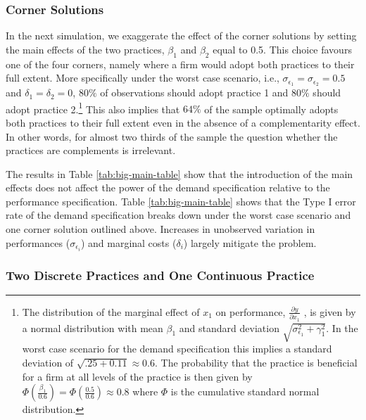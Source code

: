 \documentclass[12pt]{article}
\begin{document}
\subsubsection{Corner Solutions}

In the next simulation, we exaggerate the effect of the corner solutions by setting the main effects of the two practices, $\beta_{1}$ and $\beta_2$ equal to 0.5. This choice favours one of the four corners, namely where a firm would adopt both practices to their full extent. More specifically under the worst case scenario, i.e., $\sigma_{\epsilon_1} = \sigma_{\epsilon_2} = 0.5$ and $\delta_1 = \delta_2 = 0$, $80\%$ of observations should adopt practice 1 and $80\%$ should adopt practice 2.\footnote{The distribution of the marginal effect of $x_1$  on performance, $\frac{\partial y}{\partial x_1}$ , is given by a normal distribution with mean $\beta_1$ and standard deviation $\sqrt{\sigma_{\epsilon_1}^2 + \gamma_1^2}$. In the worst case scenario for the demand specification this implies a standard deviation of $\sqrt{.25 + 0.11} \approx  0.6$. The probability that the practice is beneficial for a firm at all levels of the practice is then given by $\Phi(\frac{\beta_1}{0.6}) = \Phi(\frac{0.5}{0.6}) \approx 0.8$ where $\Phi$ is the cumulative standard normal distribution.}
This also implies that $64\%$ of the sample optimally adopts both practices to their full extent even in the absence of a complementarity effect. In other words, for almost two thirds of the sample the question whether the practices are complements is irrelevant.   



The results in Table \ref{tab:big-main-table} show that the introduction of the main effects does not affect the power of the demand specification relative to the performance specification. Table \ref{tab:big-main-table} shows that the Type I error rate of the demand specification breaks down under the worst case scenario and one corner solution outlined above. Increases in unobserved variation in performances ($\sigma_{\epsilon_i}$) and marginal costs ($\delta_i$) largely mitigate the problem. 

\subsubsection{Two Discrete Practices and One Continuous Practice}
\end{document}
